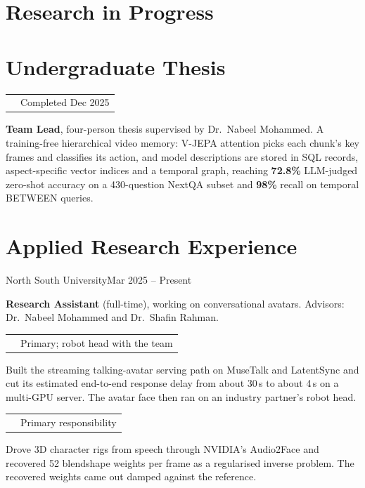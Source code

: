 \documentclass[a4paper,11pt]{article}
\makeatletter
\newcommand{\strand}[4]{%
\par\addvspace{3.5pt}%
\Needspace{3\baselineskip}%
\begingroup
\renewcommand{\arraystretch}{1.0}%
\setlength{\tabcolsep}{0pt}%
\begin{tabularx}{\textwidth}
  {@{}>{\RaggedRight\arraybackslash}X@{\hspace{0.8em}}>{\raggedleft\arraybackslash}p{\cvStatusWidth}@{}}
  {\sffamily\bfseries\fontsize{10pt}{12pt}\selectfont
   \href{https://tanvirahmedkhan74.github.io/milab/\##1}{#2}} & {\small #3}
\end{tabularx}%
\endgroup
\par\nobreak\vspace{1pt}%
{\small\RaggedRight\hyphenpenalty=10000\exhyphenpenalty=10000\relax #4\par}}
\renewcommand{\entryHeading}[2]{%
\par
\begingroup
\renewcommand{\arraystretch}{1.0}%
\setlength{\tabcolsep}{0pt}%
\begin{tabularx}{\textwidth}
  {@{}>{\RaggedRight\arraybackslash}X@{\hspace{0.7em}}>{\raggedleft\arraybackslash}p{\cvStatusWidth}@{}}
  {\bfseries\fontsize{10pt}{12.5pt}\selectfont\exhyphenpenalty=10000\hyphenpenalty=10000\relax #1} & {\small #2}
\end{tabularx}%
\endgroup
\par\nobreak}
\makeatother
\begin{document}
\section{Research in Progress}
\vspace{-3pt}
\cvResearch

\section{Undergraduate Thesis}
\entryHeading{\href{https://tanvirahmedkhan74.github.io/research/pneuma/}{PNEUMA --- Perceptual
Noesis for Episodic Universal Memory Architecture}}{Completed Dec 2025}
\par\nobreak\vspace{1pt}
{\small\RaggedRight{}\relax
\textbf{Team Lead}, four-person thesis supervised by Dr.~Nabeel Mohammed. A training-free
hierarchical video memory: V-JEPA attention picks each chunk's key frames and classifies its action,
and model descriptions are stored in SQL records, aspect-specific vector indices and a temporal graph,
reaching \textbf{72.8\%} LLM-judged zero-shot accuracy on a 430-question NextQA subset and
\textbf{98\%} recall on temporal BETWEEN queries.\par}

\section{Applied Research Experience}
{North South University}{Mar 2025 -- Present}
\par\vspace{-5pt}
{\small\RaggedRight \textbf{Research Assistant} (full-time), working on conversational avatars. Advisors:
Dr.~Nabeel Mohammed and Dr.~Shafin Rahman.\par}

\strand{pipelines}{Conversational pipelines and response delay}{Primary; robot head with the team}
{Built the streaming talking-avatar serving path on MuseTalk and LatentSync and cut its estimated
end-to-end response delay from about 30\,s to about 4\,s on a multi-GPU server. The avatar face
then ran on an industry partner's robot head.}

\strand{audio2face}{Audio-driven 3D avatars and blendshape control}{Primary responsibility}
{Drove 3D character rigs from speech through NVIDIA's Audio2Face and recovered 52 blendshape
weights per frame as a regularised inverse problem. The recovered weights came out damped against
the reference.}
\end{document}
